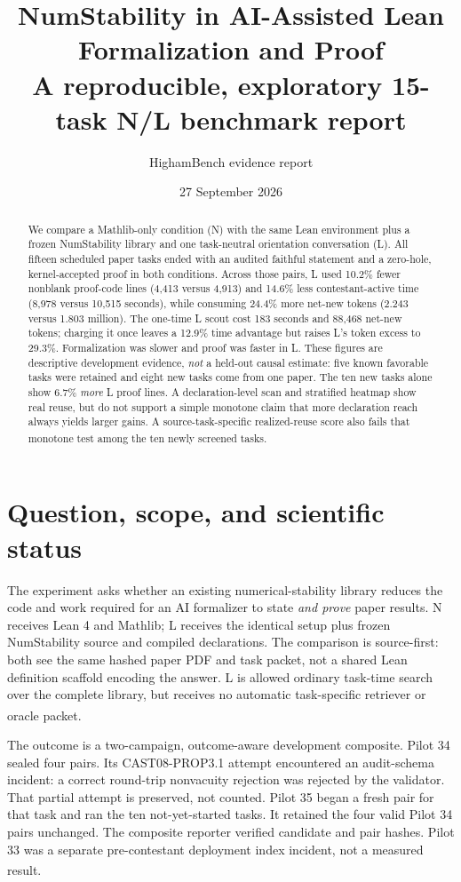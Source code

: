 \documentclass[10pt,a4paper]{article}
\title{\vspace{-13mm}\textbf{NumStability in AI-Assisted Lean Formalization and Proof}\\[2mm]
\large A reproducible, exploratory 15-task N/L benchmark report}
\author{HighamBench evidence report}
\date{27 September 2026}
\newcommand{\src}[1]{\textsuperscript{\cite{#1}}}
\begin{document}
\maketitle
\begin{abstract}
We compare a Mathlib-only condition (N) with the same Lean environment plus a
frozen NumStability library and one task-neutral orientation conversation (L).
All fifteen scheduled paper tasks ended with an audited faithful statement and
a zero-hole, kernel-accepted proof in both conditions. Across those pairs, L
used 10.2\% fewer nonblank proof-code lines (4,413 versus 4,913) and 14.6\%
less contestant-active time (8,978 versus 10,515 seconds), while consuming
24.4\% more net-new tokens (2.243 versus 1.803 million). The one-time L scout
cost 183 seconds and 88,468 net-new tokens; charging it once leaves a 12.9\%
time advantage but raises L's token excess to 29.3\%. Formalization was slower
and proof was faster in L. These figures are descriptive development evidence,
\emph{not} a held-out causal estimate: five known favorable tasks were retained
and eight new tasks come from one paper. The ten new tasks alone show 6.7\%
\emph{more} L proof lines. A declaration-level scan and stratified heatmap show
real reuse, but do not support a simple monotone claim that more declaration
reach always yields larger gains. A source-task-specific realized-reuse score
also fails that monotone test among the ten newly screened tasks.\src{results35,warmroot,corpus33,plotcode,reusemap}
\end{abstract}

\section{Question, scope, and scientific status}

The experiment asks whether an existing numerical-stability library reduces
the code and work required for an AI formalizer to state \emph{and prove}
paper results. N receives Lean 4 and Mathlib; L receives the identical setup
plus frozen NumStability source and compiled declarations. The comparison is
source-first: both see the same hashed paper PDF and task packet, not a shared
Lean definition scaffold encoding the answer. L is allowed ordinary task-time
search over the complete library, but receives no automatic task-specific
retriever or oracle packet.\src{protocol27,commonprompt,lprompt,corpus33}

The outcome is a two-campaign, outcome-aware development composite. Pilot 34
sealed four pairs. Its CAST08-PROP3.1 attempt encountered an audit-schema
incident: a correct round-trip nonvacuity rejection was rejected by the
validator. That partial attempt is preserved, not counted. Pilot 35 began a
fresh pair for that task and ran the ten not-yet-started tasks. It retained
the four valid Pilot 34 pairs unchanged. The composite reporter verified
candidate and pair hashes. Pilot 33 was a separate pre-contestant deployment
index incident, not a measured result.\src{results35,recovery35,reporter35}
\end{document}
